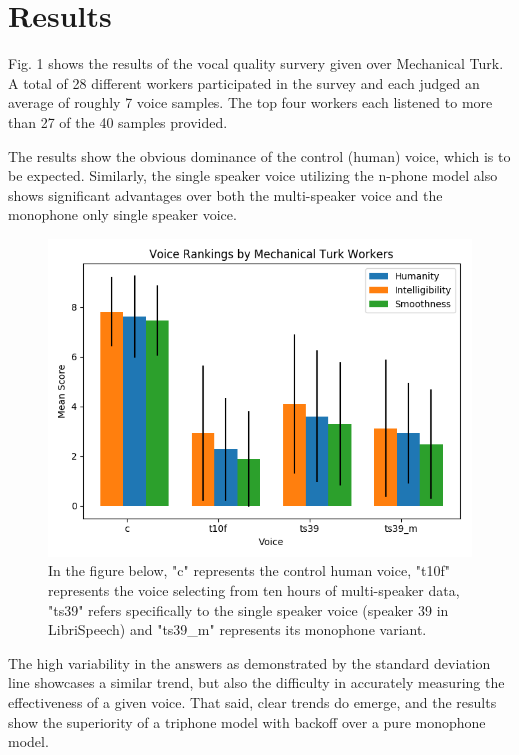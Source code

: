 \documentclass[10pt, journal, compsoc]{IEEEtran}
\begin{document}
\section{Results}
Fig. 1 shows the results of the vocal quality survery given over Mechanical Turk. A total of 28 different workers participated in the survey and each judged an average of roughly 7 voice samples. The top four workers each listened to more than 27 of the 40 samples provided. \par
The results show the obvious dominance of the control (human) voice, which is to be expected. Similarly, the single speaker voice utilizing the n-phone model also shows significant advantages over both the multi-speaker voice and the monophone only single speaker voice.\par
\begin{figure}[h]
\caption{In the figure below, "c" represents the control human voice, "t10f" represents the voice selecting from ten hours of multi-speaker data, "ts39" refers specifically to the single speaker voice (speaker 39 in LibriSpeech) and "ts39\_m" represents its monophone variant.}
\centering
\includegraphics[scale=0.5]{../experiments/results/results_graph.png}
\end{figure}
The high variability in the answers as demonstrated by the standard deviation line showcases a similar trend, but also the difficulty in accurately measuring the effectiveness of a given voice. That said, clear trends do emerge, and the results show the superiority of a triphone model with backoff over a pure monophone model. 
\end{document}
